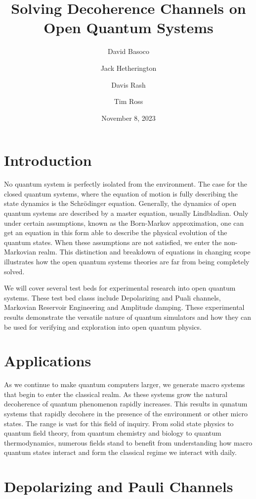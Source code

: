 \documentclass[12pt]{article}
\title{Solving Decoherence Channels on Open Quantum Systems}
\author{David Basoco \and Jack Hetherington \and Davis Rash \and Tim Ross}
\date{November 8, 2023}
\begin{document}
  \maketitle

  \section{Introduction}
  No quantum system is perfectly isolated from the environment. The case for the closed quantum systems, where the equation of motion is fully describing the state dynamics is the Schr\"{o}dinger equation. Generally, the dynamics of open quantum systems are described by a master equation, usually Lindbladian. Only under certain assumptions, known as the Born-Markov approximation, one can get an equation in this form able to describe the physical evolution of the quantum states. When these assumptions are not satisfied, we enter the non-Markovian realm. This distinction and breakdown of equations in changing scope illustrates how the open quantum systems theories are far from being completely solved.  

  We will cover several test beds for experimental research into open quantum systems. These test bed classs include Depolarizing and Puali channels, Markovian Reservoir Engineering and Amplitude damping. These experimental results demonstrate the versatile nature of quantum simulators and how they can be used for verifying and exploration into open quantum physics. 
  \blindtext

  \section{Applications}
  As we continue to make quantum computers larger, we generate macro systems that begin to enter the classical realm. As these systems grow the natural decoherence of quantum phenomenon rapidly increases. This results in qunatum systems that rapidly decohere in the presence of the environment or other micro states. The range is vast for this field of inquiry. From solid state physics to quantum field theory, from quantum chemistry and biology to quantum thermodynamics, numerous fields stand to benefit from understanding how macro quantum states interact and form the classical regime we interact with daily.
  \blindtext

  \section{Depolarizing and Pauli Channels}
  \blindtext
\end{document}
